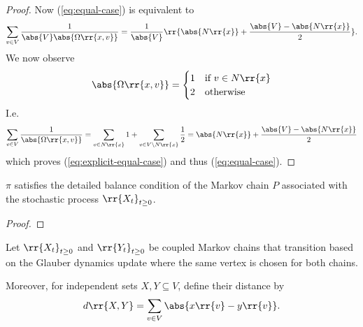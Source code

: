 \documentclass{article}
\begin{document}
\begin{claim*}[1]
\begin{proof}
    Now (\ref{eq:equal-case}) is equivalent to
    \begin{align}
      \label{eq:explicit-equal-case}
      \sum_{v\in V} \frac{1}{\abs{V}\abs{\Omega\rr{x,v}}} = \frac{1}{\abs{V}} \rr{\abs{N\rr{x}} + \frac{\abs{V}-\abs{N\rr{x}}}{2}}.
    \end{align}
    We now observe
    \begin{align*}
      \abs{\Omega\rr{x,v}} =
      \begin{cases}
        1 & \text{if } v\in N\rr{x} \\
        2 & \text{otherwise}
      \end{cases}
    \end{align*}
    I.e.
    \begin{align*}
      \sum_{v\in V} \frac{1}{\abs{\Omega\rr{x,v}}} = \sum_{v\in N\rr{x}} 1 + \sum_{v\in V\setminus N\rr{x}} \frac{1}{2} =  \abs{N\rr{x}} + \frac{\abs{V}-\abs{N\rr{x}}}{2}
    \end{align*}
    which proves (\ref{eq:explicit-equal-case}) and thus (\ref{eq:equal-case}).
  \end{proof}
\end{claim*}

\begin{claim*}[2]
  $\pi$ satisfies the detailed balance condition of the Markov chain $P$ associated
  with the stochastic process $\rr{X_t}_{t\geq 0}$.
  \begin{proof}

  \end{proof}
\end{claim*}

Let $\rr{X_t}_{t\geq 0}$ and $\rr{Y_t}_{t\geq 0}$ be coupled Markov chains that transition
based on the Glauber dynamics update where the same vertex is chosen for both chains.

Moreover, for independent sets $X,Y\subseteq V$, define their distance by
\begin{align*}
  d\rr{X,Y} = \sum_{v\in V} \abs{x\rr{v}-y\rr{v}}.
\end{align*}

\begin{claim*}[3]
\end{claim*}
\end{document}
